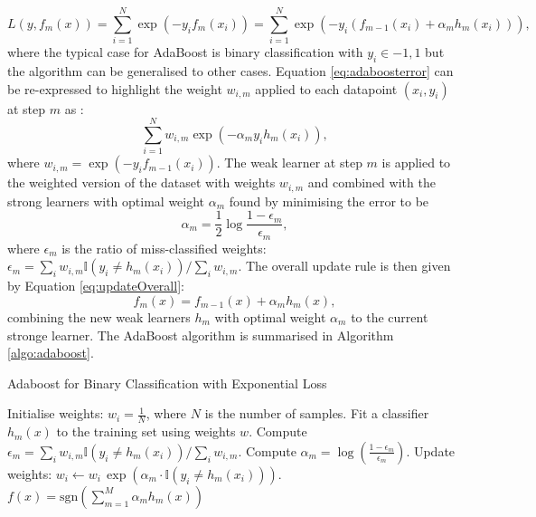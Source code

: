 \begin{equation}\label{eq:adaboosterror}
    L(y, f_m(x)) = \sum_{i=1}^N \exp\left(-y_i f_m(x_i)\right) = \sum_{i=1}^N \exp\left(-y_i (f_{m-1}(x_i) + \alpha_m h_m(x_i))\right),
\end{equation}
where the typical case for AdaBoost is binary classification with $y_i \in {-1, 1}$ but the algorithm can be generalised to other cases. Equation \ref{eq:adaboosterror} can be re-expressed to highlight the weight $w_{i,m}$ applied to each datapoint $(x_i, y_i)$ at step $m$ as : \[\sum_{i=1}^N w_{i,m} \exp\left(-\alpha_m y_i h_m(x_i)\right),\] where $w_{i,m} = \exp\left(-y_i f_{m-1}(x_i)\right)$. The weak learner at step $m$ is applied to the weighted version of the dataset with weights $w_{i,m}$ and combined with the strong learners with optimal weight $\alpha_m$ found by minimising the error to be \[\alpha_m = \frac{1}{2} \log \frac{1 - \epsilon_m}{\epsilon_m},\] where $\epsilon_m$ is the ratio of miss-classified weights: $\epsilon_m = \sum_i w_{i,m} \mathbb{I}(y_i \neq h_m(x_i)) / \sum_i w_{i,m}$. The overall update rule is then given by Equation \ref{eq:updateOverall}:
\begin{equation}\label{eq:updateOverall}
    f_m(x) = f_{m-1}(x) + \alpha_m h_m(x),
\end{equation}
combining the new weak learners $h_m$ with optimal weight $\alpha_m$ to the current stronge learner. The AdaBoost algorithm is summarised in Algorithm \ref{algo:adaboost}.

\begin{algorithm}
    \caption{Adaboost for Binary Classification with Exponential Loss \cite{MurphyML}}
    \label{algo:adaboost}
    \begin{algorithmic}
    \State Initialise weights: $w_i = \frac{1}{N}$, where $N$ is the number of samples.
        \State Fit a classifier $h_m(x)$ to the training set using weights $w$.
        \State Compute $\epsilon_m = \sum_i w_{i,m} \mathbb{I}(y_i \neq h_m(x_i)) / \sum_i w_{i,m}$.
        \State Compute $\alpha_m = \log\left(\frac{1 - \epsilon_m}{\epsilon_m}\right)$.
        \State Update weights: $w_i \leftarrow w_i \, \exp(\alpha_m \cdot \mathbb{I}(y_i \neq h_m(x_i)))$.
    \EndFor
    \State \Return $f(x) = \text{sgn}\left(\sum_{m=1}^M \alpha_m h_m(x)\right)$
    \end{algorithmic}
\end{algorithm}


